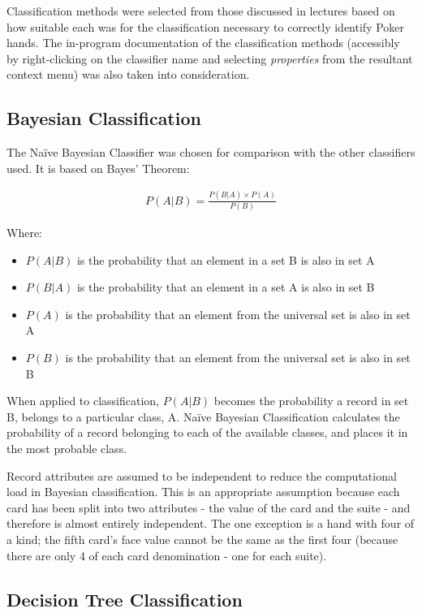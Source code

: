\documentclass[11pt, a4paper]{article}
\begin{document}
Classification methods were selected from those discussed in lectures based on how suitable each was for the classification necessary to correctly identify Poker hands. The in-program documentation of the classification methods (accessibly by right-clicking on the classifier name and selecting \textit{properties} from the resultant context menu) was also taken into consideration. 

\subsection*{Bayesian Classification}

The Na\"ive Bayesian Classifier was chosen for comparison with the other classifiers used. It is based on Bayes' Theorem:

\begin{align*}
	P(A|B) = \frac{P(B|A) \times P(A)}{P(B)}
\end{align*}

Where:

\begin{itemize}
	\item $P(A|B)$ is the probability that an element in a set B is also in set A
	\item $P(B|A)$ is the probability that an element in a set A is also in set B
	\item $P(A)$ is the probability that an element from the universal set is also in set A
	\item $P(B)$ is the probability that an element from the universal set is also in set B
\end{itemize}

When applied to classification, $P(A|B)$ becomes the probability a record in set B, belongs to a particular class, A. Na\"ive Bayesian Classification calculates the probability of a record belonging to each of the available classes, and places it in the most probable class.	

Record attributes are assumed to be independent to reduce the computational load in Bayesian classification. This is an appropriate assumption because each card has been split into two attributes - the value of the card and the suite - and therefore is almost entirely independent. The one exception is a hand with four of a kind; the fifth card's face value cannot be the same as the first four (because there are only 4 of each card denomination - one for each suite).

\subsection*{Decision Tree Classification}
\end{document}
